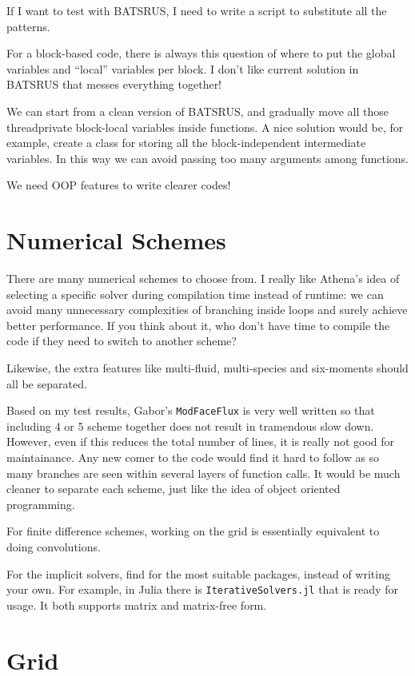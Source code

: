 \documentclass[11pt]{book} %
\begin{document}
If I want to test with BATSRUS, I need to write a script to substitute all the patterns.

For a block-based code, there is always this question of where to put the global variables and ``local'' variables per block.
I don't like current solution in BATSRUS that messes everything together!

We can start from a clean version of BATSRUS, and gradually move all those threadprivate block-local variables inside functions. A nice solution would be, for example, create a class for storing all the block-independent intermediate variables. In this way we can avoid passing too many arguments among functions.

We need OOP features to write clearer codes!

\section{Numerical Schemes}

There are many numerical schemes to choose from. I really like Athena's idea of selecting a specific solver during compilation time instead of runtime: we can avoid many unnecessary complexities of branching inside loops and surely achieve better performance. If you think about it, who don't have time to compile the code if they need to switch to another scheme?

Likewise, the extra features like multi-fluid, multi-species and six-moments should all be separated.

Based on my test results, Gabor's \verb|ModFaceFlux| is very well written so that including 4 or 5 scheme together does not result in tramendous slow down. However, even if this reduces the total number of lines, it is really not good for maintainance. Any new comer to the code would find it hard to follow as so many branches are seen within several layers of function calls. It would be much cleaner to separate each scheme, just like the idea of object oriented programming.

For finite difference schemes, working on the grid is essentially equivalent to doing convolutions.

For the implicit solvers, find for the most suitable packages, instead of writing your own. For example, in Julia there is \verb|IterativeSolvers.jl| that is ready for usage. It both supports matrix and matrix-free form.

\section{Grid}
\end{document}
